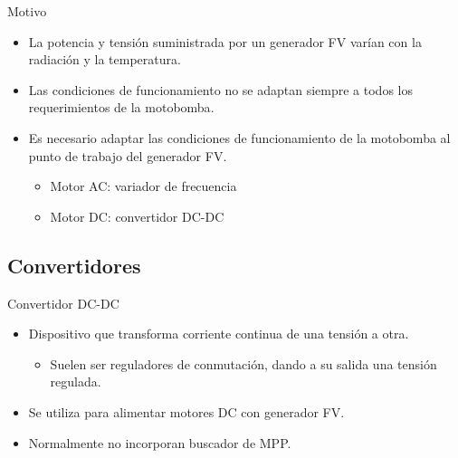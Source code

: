 \documentclass[xcolor={usenames,svgnames,dvipsnames}]{beamer}
\begin{document}
\begin{frame}[label={sec:org2621532}]{Motivo}
\begin{itemize}
\item La \alert{potencia y tensión suministrada por un generador FV varían} con la radiación y la temperatura.

\item Las condiciones de funcionamiento \alert{no se adaptan siempre a todos los requerimientos de la motobomba}.

\item Es necesario adaptar las condiciones de funcionamiento de la motobomba al punto de trabajo del generador FV.

\begin{itemize}
\item \alert{Motor AC: variador de frecuencia}

\item \alert{Motor DC: convertidor DC-DC}
\end{itemize}
\end{itemize}
\end{frame}

\subsection{Convertidores}
\label{sec:org54c13e8}
\begin{frame}[label={sec:orge6b1dce}]{Convertidor DC-DC}
\begin{itemize}
\item Dispositivo que \alert{transforma corriente continua de una tensión a otra}.

\begin{itemize}
\item Suelen ser reguladores de conmutación, dando a su salida una tensión regulada.
\end{itemize}

\item Se utiliza para alimentar \alert{motores DC con generador FV}.

\item Normalmente no incorporan buscador de MPP.
\end{itemize}
\end{frame}
\end{document}
